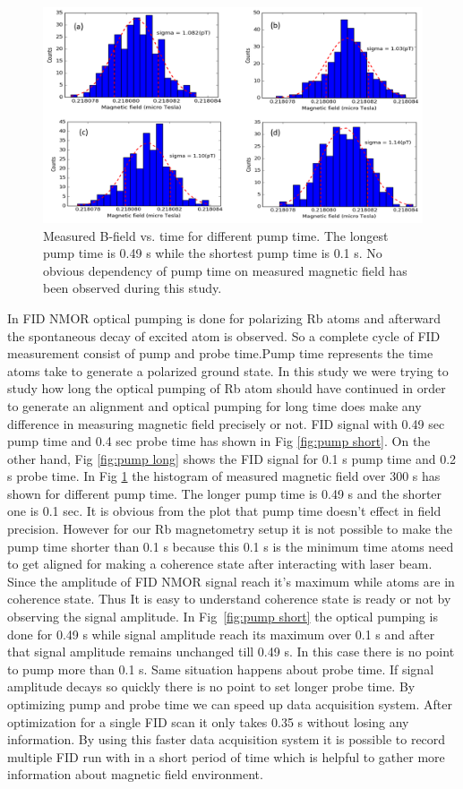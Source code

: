    \begin{figure}[h]
\centering\includegraphics[width=0.75\linewidth]{figures/pump_time}
\caption{Measured B-field vs. time   for different pump time. The longest pump time is 0.49 s while the shortest pump time is 0.1 s. No obvious dependency of pump time on  measured magnetic field has been observed during this study.\label{fig:different pump time}}
\end{figure}
In FID NMOR optical pumping is done for polarizing Rb atoms and afterward the spontaneous decay of excited atom is observed. So a complete cycle of FID measurement consist of pump and probe time.Pump time represents the time atoms take to generate a polarized ground state. In this study we were trying to study how long the optical pumping of Rb atom should have continued in order to generate an alignment and optical pumping for long time does make any difference in measuring magnetic field precisely or not. FID signal with 0.49 sec pump time and 0.4 sec probe time has shown in Fig \ref{fig:pump short}. On the other hand, Fig \ref{fig:pump long} shows  the FID signal for 0.1 s pump time and 0.2 s probe time. In Fig \ref{fig:different pump time} the histogram of measured magnetic field over 300 s has shown for different pump time. The longer pump time is 0.49 s and the shorter one is 0.1 sec. It is obvious from the plot that pump time doesn't effect in field precision. However for our Rb magnetometry setup it is not possible to make the pump time shorter than 0.1 s because this 0.1 s is the minimum time atoms need to get aligned for making a coherence state after interacting with laser beam. Since the amplitude of FID NMOR signal reach it's maximum while atoms are in coherence state. Thus It is easy to understand coherence state is ready or not by observing the signal amplitude. In Fig~\ref{fig:pump short} the optical pumping is done for 0.49 s while signal amplitude reach its maximum over 0.1 s and after that signal amplitude remains unchanged till 0.49 s. In this case there is no point to pump more than 0.1 s. Same situation happens about probe time. If signal amplitude decays so quickly there is no point to set longer probe time. By optimizing pump and probe time we can speed up data acquisition system. After optimization for a single FID scan it only takes 0.35 s  without losing any information. By using this faster data acquisition system it is possible to record multiple FID run with in a short period of time which is helpful to gather more information about magnetic field environment.
